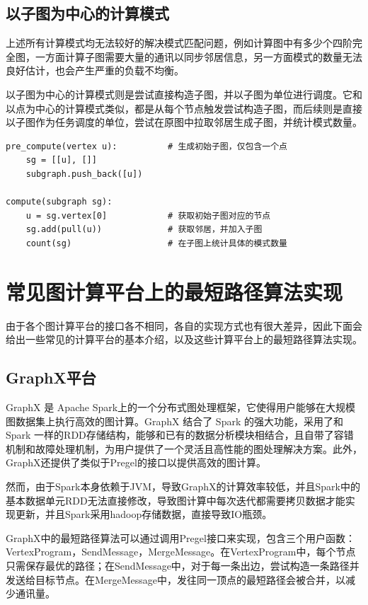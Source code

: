 \subsection{以子图为中心的计算模式}

上述所有计算模式均无法较好的解决模式匹配问题，例如计算图中有多少个四阶完全图，一方面计算子图需要大量的通讯以同步邻居信息，另一方面模式的数量无法良好估计，也会产生严重的负载不均衡。

以子图为中心的计算模式则是尝试直接构造子图，并以子图为单位进行调度。它和以点为中心的计算模式类似，都是从每个节点触发尝试构造子图，而后续则是直接以子图作为任务调度的单位，尝试在原图中拉取邻居生成子图，并统计模式数量。
\begin{lstlisting}
pre_compute(vertex u):          # 生成初始子图，仅包含一个点
    sg = [[u], []]
    subgraph.push_back([u])

compute(subgraph sg):
    u = sg.vertex[0]            # 获取初始子图对应的节点
    sg.add(pull(u))             # 获取邻居，并加入子图
    count(sg)                   # 在子图上统计具体的模式数量
\end{lstlisting}



\section{常见图计算平台上的最短路径算法实现}
\label{sec:distribution_algorithm}

由于各个图计算平台的接口各不相同，各自的实现方式也有很大差异，因此下面会给出一些常见的计算平台的基本介绍，以及这些计算平台上的最短路径算法实现。

\subsection{GraphX平台}

GraphX 是 Apache Spark上的一个分布式图处理框架，它使得用户能够在大规模图数据集上执行高效的图计算。GraphX 结合了 Spark 的强大功能，采用了和 Spark 一样的RDD存储结构，能够和已有的数据分析模块相结合，且自带了容错机制和故障处理机制，为用户提供了一个灵活且高性能的图处理解决方案。此外，GraphX还提供了类似于Pregel的接口以提供高效的图计算。

然而，由于Spark本身依赖于JVM，导致GraphX的计算效率较低，并且Spark中的基本数据单元RDD无法直接修改，导致图计算中每次迭代都需要拷贝数据才能实现更新，并且Spark采用hadoop存储数据，直接导致IO瓶颈。

GraphX中的最短路径算法可以通过调用Pregel接口来实现，包含三个用户函数：VertexProgram，SendMessage，MergeMessage。在VertexProgram中，每个节点只需保存最优的路径；在SendMessage中，对于每一条出边，尝试构造一条路径并发送给目标节点。在MergeMessage中，发往同一顶点的最短路径会被合并，以减少通讯量。

